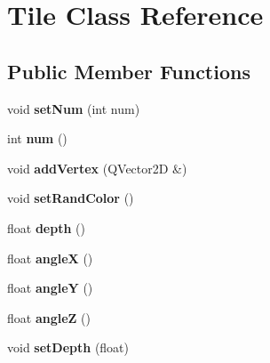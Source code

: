 \hypertarget{class_tile}{}\section{Tile Class Reference}
\label{class_tile}
\subsection*{Public Member Functions}
\begin{DoxyCompactItemize}
\item 
\hypertarget{class_tile_ad7238a794ab70ff75d171810078bc9dd}{}void {\bfseries set\+Num} (int num)\label{class_tile_ad7238a794ab70ff75d171810078bc9dd}

\item 
\hypertarget{class_tile_a437df959501e4730e77650d8a8337597}{}int {\bfseries num} ()\label{class_tile_a437df959501e4730e77650d8a8337597}

\item 
\hypertarget{class_tile_a80c663d21377778108a06a3eddb15475}{}void {\bfseries add\+Vertex} (Q\+Vector2\+D \&)\label{class_tile_a80c663d21377778108a06a3eddb15475}

\item 
\hypertarget{class_tile_a2e323f184c780a57e1a13b99ebe5f04a}{}void {\bfseries set\+Rand\+Color} ()\label{class_tile_a2e323f184c780a57e1a13b99ebe5f04a}

\item 
\hypertarget{class_tile_a0354494ef2c3e38155237628e40ca8db}{}float {\bfseries depth} ()\label{class_tile_a0354494ef2c3e38155237628e40ca8db}

\item 
\hypertarget{class_tile_a4ebdc5646945e0ca9bd09214b0de0d68}{}float {\bfseries angle\+X} ()\label{class_tile_a4ebdc5646945e0ca9bd09214b0de0d68}

\item 
\hypertarget{class_tile_a42d97b17e33adb4a694fb0610315aac5}{}float {\bfseries angle\+Y} ()\label{class_tile_a42d97b17e33adb4a694fb0610315aac5}

\item 
\hypertarget{class_tile_aae18f9c696eef2d0ca491873ca8cad36}{}float {\bfseries angle\+Z} ()\label{class_tile_aae18f9c696eef2d0ca491873ca8cad36}

\item 
\hypertarget{class_tile_a93e6ca9e1a8a2222a9643fd258ca7be6}{}void {\bfseries set\+Depth} (float)\label{class_tile_a93e6ca9e1a8a2222a9643fd258ca7be6}


\end{DoxyCompactItemize}
